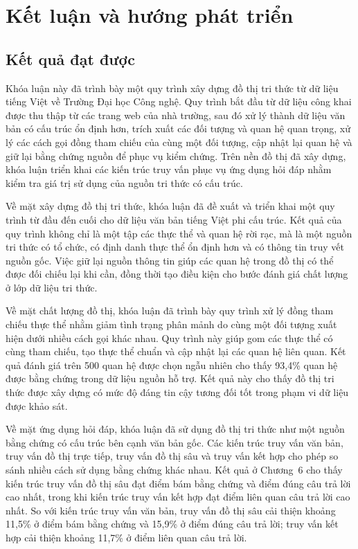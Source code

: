 \chapter{Kết luận và hướng phát triển}

\section{Kết quả đạt được}

Khóa luận này đã trình bày một quy trình xây dựng đồ thị tri thức từ dữ liệu tiếng Việt về Trường Đại học Công nghệ. Quy trình bắt đầu từ dữ liệu công khai được thu thập từ các trang web của nhà trường, sau đó xử lý thành dữ liệu văn bản có cấu trúc ổn định hơn, trích xuất các đối tượng và quan hệ quan trọng, xử lý các cách gọi đồng tham chiếu của cùng một đối tượng, cập nhật lại quan hệ và giữ lại bằng chứng nguồn để phục vụ kiểm chứng. Trên nền đồ thị đã xây dựng, khóa luận triển khai các kiến trúc truy vấn phục vụ ứng dụng hỏi đáp nhằm kiểm tra giá trị sử dụng của nguồn tri thức có cấu trúc.

Về mặt xây dựng đồ thị tri thức, khóa luận đã đề xuất và triển khai một quy trình từ đầu đến cuối cho dữ liệu văn bản tiếng Việt phi cấu trúc. Kết quả của quy trình không chỉ là một tập các thực thể và quan hệ rời rạc, mà là một nguồn tri thức có tổ chức, có định danh thực thể ổn định hơn và có thông tin truy vết nguồn gốc. Việc giữ lại nguồn thông tin giúp các quan hệ trong đồ thị có thể được đối chiếu lại khi cần, đồng thời tạo điều kiện cho bước đánh giá chất lượng ở lớp dữ liệu tri thức.

Về mặt chất lượng đồ thị, khóa luận đã trình bày quy trình xử lý đồng tham chiếu thực thể nhằm giảm tình trạng phân mảnh do cùng một đối tượng xuất hiện dưới nhiều cách gọi khác nhau. Quy trình này giúp gom các thực thể có cùng tham chiếu, tạo thực thể chuẩn và cập nhật lại các quan hệ liên quan. Kết quả đánh giá trên 500 quan hệ được chọn ngẫu nhiên cho thấy 93,4\% quan hệ được bằng chứng trong dữ liệu nguồn hỗ trợ. Kết quả này cho thấy đồ thị tri thức được xây dựng có mức độ đáng tin cậy tương đối tốt trong phạm vi dữ liệu được khảo sát.

Về mặt ứng dụng hỏi đáp, khóa luận đã sử dụng đồ thị tri thức như một nguồn bằng chứng có cấu trúc bên cạnh văn bản gốc. Các kiến trúc truy vấn văn bản, truy vấn đồ thị trực tiếp, truy vấn đồ thị sâu và truy vấn kết hợp cho phép so sánh nhiều cách sử dụng bằng chứng khác nhau. Kết quả ở Chương~6 cho thấy kiến trúc truy vấn đồ thị sâu đạt điểm bám bằng chứng và điểm đúng câu trả lời cao nhất, trong khi kiến trúc truy vấn kết hợp đạt điểm liên quan câu trả lời cao nhất. So với kiến trúc truy vấn văn bản, truy vấn đồ thị sâu cải thiện khoảng 11,5\% ở điểm bám bằng chứng và 15,9\% ở điểm đúng câu trả lời; truy vấn kết hợp cải thiện khoảng 11,7\% ở điểm liên quan câu trả lời.

